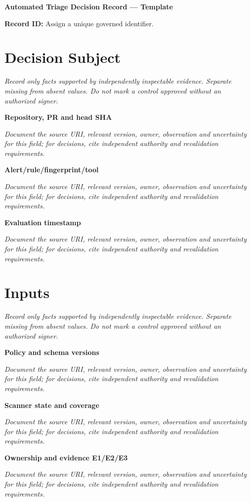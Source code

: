 \documentclass[11pt,letterpaper]{article}
\begin{document}
\begin{center}{\LARGE\bfseries Automated Triage Decision Record --- Template}\par
\vspace{4pt}{\small Guided authoring instrument (not a completed assessment)}\par
\end{center}
\noindent\textbf{Record ID:} Assign a unique governed identifier.\par
\section{Decision Subject}
\noindent\emph{Record only facts supported by independently inspectable evidence. Separate missing from absent values. Do not mark a control approved without an authorized signer.}\par
\noindent\textbf{Repository, PR and head SHA}\par
\noindent\emph{Document the source URI, relevant version, owner, observation and uncertainty for this field; for decisions, cite independent authority and revalidation requirements.}\par\medskip
\noindent\textbf{Alert/rule/fingerprint/tool}\par
\noindent\emph{Document the source URI, relevant version, owner, observation and uncertainty for this field; for decisions, cite independent authority and revalidation requirements.}\par\medskip
\noindent\textbf{Evaluation timestamp}\par
\noindent\emph{Document the source URI, relevant version, owner, observation and uncertainty for this field; for decisions, cite independent authority and revalidation requirements.}\par\medskip
\section{Inputs}
\noindent\emph{Record only facts supported by independently inspectable evidence. Separate missing from absent values. Do not mark a control approved without an authorized signer.}\par
\noindent\textbf{Policy and schema versions}\par
\noindent\emph{Document the source URI, relevant version, owner, observation and uncertainty for this field; for decisions, cite independent authority and revalidation requirements.}\par\medskip
\noindent\textbf{Scanner state and coverage}\par
\noindent\emph{Document the source URI, relevant version, owner, observation and uncertainty for this field; for decisions, cite independent authority and revalidation requirements.}\par\medskip
\noindent\textbf{Ownership and evidence E1/E2/E3}\par
\noindent\emph{Document the source URI, relevant version, owner, observation and uncertainty for this field; for decisions, cite independent authority and revalidation requirements.}\par\medskip
\end{document}
